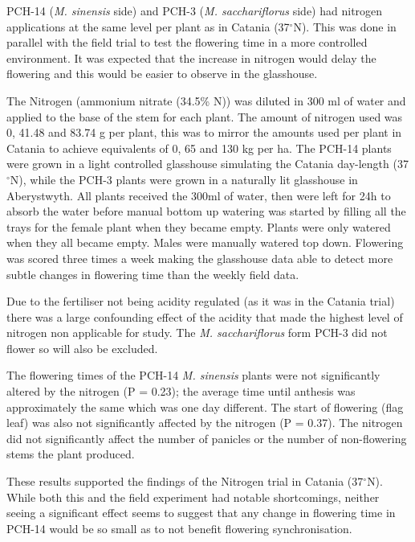 \documentclass[fleqn, 15pt, lineno]{olplainarticle}
\begin{document}
PCH-14 (\textit{M. sinensis} side) and PCH-3 (\textit{M. sacchariflorus} side) had nitrogen applications at the same level per plant as in Catania (37$^{\circ}$N).
This was done in parallel with the field trial to test the flowering time in a more controlled environment.
It was expected that the increase in nitrogen would delay the flowering and this would be easier to observe in the glasshouse.

The Nitrogen (ammonium nitrate (34.5\% N)) was diluted in 300 ml of water and applied to the base of the stem for each plant.
The amount of nitrogen used was 0, 41.48 and 83.74 g per plant, this was to mirror the amounts used per plant in Catania to achieve equivalents of 0, 65 and 130 kg per ha.
The PCH-14 plants were grown in a light controlled glasshouse simulating the Catania day-length (37$^{\circ}$N), while the PCH-3 plants were grown in a naturally lit glasshouse in Aberystwyth.
All plants received the 300ml of water, then were left for 24h to absorb the water before manual bottom up watering was started by filling all the trays for the female plant when they became empty.
Plants were only watered when they all became empty.
Males were manually watered top down.
Flowering was scored three times a week making the glasshouse data able to detect more subtle changes in flowering time than the weekly field data.

Due to the fertiliser not being acidity regulated (as it was in the Catania trial) there was a large confounding effect of the acidity that made the highest level of nitrogen non applicable for study.
The \textit{M. sacchariflorus} form PCH-3 did not flower so will also be excluded.

The flowering times of the PCH-14 \textit{M. sinensis} plants were not significantly altered by the nitrogen (P = 0.23); the average time until anthesis was approximately the same which was one day different.
The start of flowering (flag leaf) was also not significantly affected by the nitrogen (P = 0.37).
The nitrogen did not significantly affect the number of panicles or the number of non-flowering stems the plant produced.

These results supported the findings of the Nitrogen trial in Catania (37$^{\circ}$N).
While both this and the field experiment had notable shortcomings, neither seeing a significant effect seems to suggest that any change in flowering time in PCH-14 would be so small as to not benefit flowering synchronisation.
\end{document}
